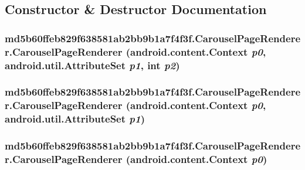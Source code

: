 \subsection{Constructor \& Destructor Documentation}
\hypertarget{classmd5b60ffeb829f638581ab2bb9b1a7f4f3f_1_1_carousel_page_renderer_345df8dd6878c845c18ebccd4fe946ad}{
\subsubsection[{CarouselPageRenderer}]{\setlength{\rightskip}{0pt plus 5cm}md5b60ffeb829f638581ab2bb9b1a7f4f3f.CarouselPageRenderer.CarouselPageRenderer (android.content.Context {\em p0}, \/  android.util.AttributeSet {\em p1}, \/  int {\em p2})}}
\label{classmd5b60ffeb829f638581ab2bb9b1a7f4f3f_1_1_carousel_page_renderer_345df8dd6878c845c18ebccd4fe946ad}


\hypertarget{classmd5b60ffeb829f638581ab2bb9b1a7f4f3f_1_1_carousel_page_renderer_1854123685532643ee3bacaf48a7c075}{
\subsubsection[{CarouselPageRenderer}]{\setlength{\rightskip}{0pt plus 5cm}md5b60ffeb829f638581ab2bb9b1a7f4f3f.CarouselPageRenderer.CarouselPageRenderer (android.content.Context {\em p0}, \/  android.util.AttributeSet {\em p1})}}
\label{classmd5b60ffeb829f638581ab2bb9b1a7f4f3f_1_1_carousel_page_renderer_1854123685532643ee3bacaf48a7c075}


\hypertarget{classmd5b60ffeb829f638581ab2bb9b1a7f4f3f_1_1_carousel_page_renderer_5d9cc96ac94ffa57b9229e1b243f3137}{
\subsubsection[{CarouselPageRenderer}]{\setlength{\rightskip}{0pt plus 5cm}md5b60ffeb829f638581ab2bb9b1a7f4f3f.CarouselPageRenderer.CarouselPageRenderer (android.content.Context {\em p0})}}
\label{classmd5b60ffeb829f638581ab2bb9b1a7f4f3f_1_1_carousel_page_renderer_5d9cc96ac94ffa57b9229e1b243f3137}




